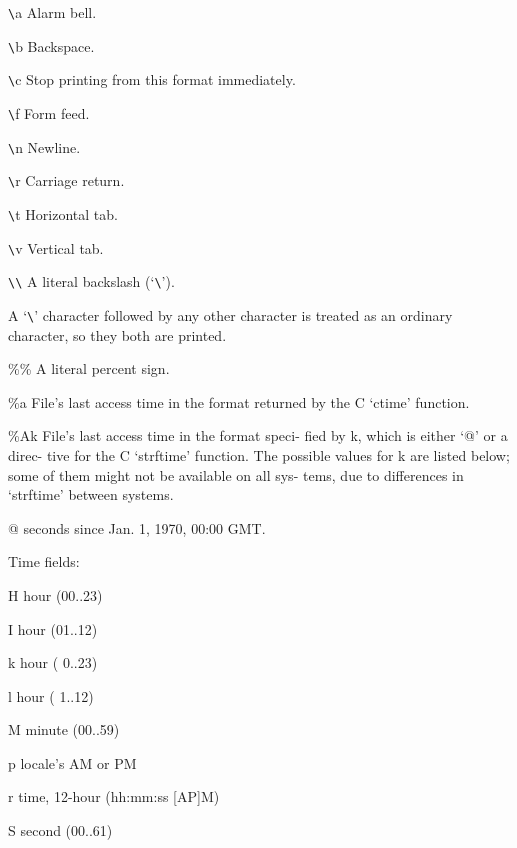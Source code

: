 \begin{description}
              \verb+\+a     Alarm bell.

              \verb+\+b     Backspace.

              \verb+\+c     Stop  printing from this format immediately.

              \verb+\+f     Form feed.

              \verb+\+n     Newline.

              \verb+\+r     Carriage return.

              \verb+\+t     Horizontal tab.

              \verb+\+v     Vertical tab.

              \verb+\+\verb+\+     A literal backslash (`\verb+\+').

              A `\verb+\+' character followed by any other character  is
              treated  as an ordinary character, so they both are
              printed.

              \%\%     A literal percent sign.

              \%a     File's  last  access  time  in  the   format
                     returned by the C `ctime' function.

              \%Ak    File's last access time in the format speci-
                     fied by k, which is either `@' or  a  direc-
                     tive  for  the  C  `strftime' function.  The
                     possible values for k are listed below; some
                     of  them  might not be available on all sys-
                     tems,  due  to  differences  in   `strftime'
                     between systems.

                      @      seconds  since  Jan.  1, 1970, 00:00
                             GMT.

                     Time fields:

                      H      hour (00..23)

                      I      hour (01..12)

                      k      hour ( 0..23)

                      l      hour ( 1..12)

                      M      minute (00..59)

                      p      locale's AM or PM

                      r      time, 12-hour (hh:mm:ss [AP]M)

                      S      second (00..61)


\end{description}
